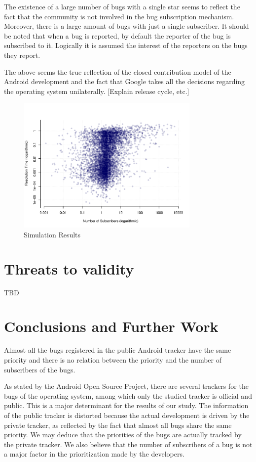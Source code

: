 \documentclass[10pt, conference, compsocconf]{IEEEtran}
\begin{document}
The existence of a large number of bugs with a single star seems to reflect the fact that the community is not involved in the bug subscription mechanism. Moreover, there is a large amount of bugs with just a single subscriber. It should be noted that when a bug is reported, by default the reporter of the bug is subscribed to it. Logically it is assumed the interest of the reporters on the bugs they report. 

The above seems the true reflection of the closed contribution model of the Android development and the fact that Google takes all the decisions regarding the operating system unilaterally. [Explain release cycle, etc.]

\begin{figure}[!t]
\centering
\includegraphics[width=3.5in]{stars-duration-log}
\caption{Simulation Results}
\label{fig:stars-duration}
\end{figure}

\section{Threats to validity}
TBD


\section{Conclusions and Further Work}
Almost all the bugs registered in the public Android tracker have the same priority and there is no relation between the priority and the number of subscribers of the bugs.

As stated by the Android Open Source Project, there are several trackers for the bugs of the operating system, among which only the studied tracker is official and public. This is a major determinant for the results of our study. The information of the public tracker is distorted because the actual development is driven by the private tracker, as reflected by the fact that almost all bugs share the same priority. We may deduce that the priorities of the bugs are actually tracked by the private tracker. We also believe that the number of subscribers of a bug is not a major factor in the prioritization made by the developers.
\end{document}
